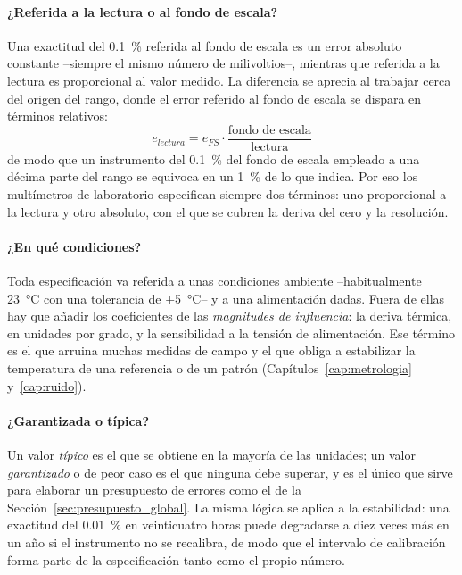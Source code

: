 \paragraph{¿Referida a la lectura o al fondo de escala?}
Una exactitud del \SI{0.1}{\percent} referida al fondo de escala es un error absoluto constante --siempre el mismo número de milivoltios--, mientras que referida a la lectura es proporcional al valor medido. La diferencia se aprecia al trabajar cerca del origen del rango, donde el error referido al fondo de escala se dispara en términos relativos:
\begin{equation}\label{eq:error_fs_lectura}
    e_{lectura} = e_{FS}\cdot\frac{\text{fondo de escala}}{\text{lectura}}
\end{equation}
de modo que un instrumento del \SI{0.1}{\percent} del fondo de escala empleado a una décima parte del rango se equivoca en un \SI{1}{\percent} de lo que indica. Por eso los multímetros de laboratorio especifican siempre dos términos: uno proporcional a la lectura y otro absoluto, con el que se cubren la deriva del cero y la resolución.

\paragraph{¿En qué condiciones?}
Toda especificación va referida a unas condiciones ambiente --habitualmente \SI{23}{\celsius} con una tolerancia de $\pm$\SI{5}{\celsius}-- y a una alimentación dadas. Fuera de ellas hay que añadir los coeficientes de las \emph{magnitudes de influencia}: la deriva térmica, en unidades por grado, y la sensibilidad a la tensión de alimentación. Ese término es el que arruina muchas medidas de campo y el que obliga a estabilizar la temperatura de una referencia o de un patrón (Capítulos~\ref{cap:metrologia} y~\ref{cap:ruido}).

\paragraph{¿Garantizada o típica?}
Un valor \emph{típico} es el que se obtiene en la mayoría de las unidades; un valor \emph{garantizado} o de peor caso es el que ninguna debe superar, y es el único que sirve para elaborar un presupuesto de errores como el de la Sección~\ref{sec:presupuesto_global}. La misma lógica se aplica a la estabilidad: una exactitud del \SI{0.01}{\percent} en veinticuatro horas puede degradarse a diez veces más en un año si el instrumento no se recalibra, de modo que el intervalo de calibración forma parte de la especificación tanto como el propio número.

